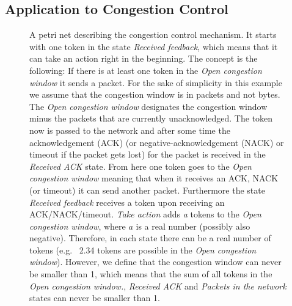 \documentclass[10pt,sigconf,anonymous]{acmart}
\newcommand\note[2]{{\color{#1}#2}}
\newcommand\todo[1]{{\note{red}{TODO: #1}}}
\begin{document}
\subsection{Application to Congestion Control}

\begin{figure}



\caption{A petri net describing the congestion control mechanism. It starts with one token in the state \textit{Received feedback}, which means that it can take an action right in the beginning. The concept is the following: If there is at least one token in the \textit{Open congestion window} it sends a packet. For the sake of simplicity in this example we assume that the congestion window is in packets and not bytes. The \textit{Open congestion window} designates the congestion window minus the packets that are currently unacknowledged. The token now is passed to the network and after some time the acknowledgement (ACK) (or negative-acknowledgement (NACK) or timeout if the packet gets lost) for the packet is received in the \textit{Received ACK} state. From here one token goes to the \textit{Open congestion window} meaning that when it receives an ACK, NACK (or timeout) it can send another packet. Furthermore the state \textit{Received feedback} receives a token upon receiving an ACK/NACK/timeout. \textit{Take action} adds \textit{a} tokens to the \textit{Open congestion window}, where $a$ is a real number (possibly also negative). Therefore, in each state there can be a real number of tokens (e.g.~ 2.34 tokens are possible in the \textit{Open congestion window}). However, we define that the congestion window can never be smaller than 1, which means that the sum of all tokens in the \textit{Open congestion window.}, \textit{Received ACK} and \textit{Packets in the network} states can never be smaller than 1.}
\label{fig:petri}
\end{figure}

\end{document}
